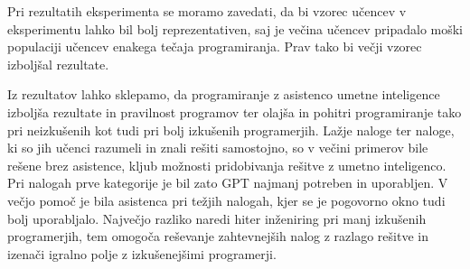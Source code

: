 \documentclass[a4paper,12pt,openright]{book}
\begin{document}
Pri rezultatih eksperimenta se moramo zavedati, da bi vzorec učencev v eksperimentu lahko bil bolj reprezentativen, saj je večina učencev pripadalo moški populaciji učencev enakega tečaja programiranja. Prav tako bi večji vzorec izboljšal rezultate.

Iz rezultatov lahko sklepamo, da programiranje z asistenco umetne inteligence izboljša rezultate in pravilnost programov ter olajša in pohitri programiranje tako pri neizkušenih kot tudi pri bolj izkušenih programerjih. Lažje naloge ter naloge, ki so jih učenci razumeli in znali rešiti samostojno, so v večini primerov bile rešene brez asistence, kljub možnosti pridobivanja rešitve z umetno inteligenco. Pri nalogah prve kategorije je bil zato GPT najmanj potreben in uporabljen. V večjo pomoč je bila asistenca pri težjih nalogah, kjer se je pogovorno okno tudi bolj uporabljalo. Največjo razliko naredi hiter inženiring pri manj izkušenih programerjih, tem omogoča reševanje zahtevnejših nalog z razlago rešitve in izenači igralno polje z izkušenejšimi programerji.

\printbibliography[heading=bibintoc,title={Literatura}]
\end{document}
